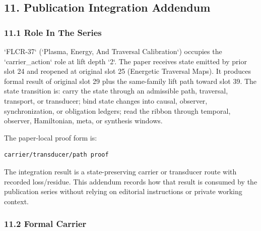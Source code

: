 \documentclass[11pt]{article}
\begin{document}
\subsection*{11. Publication Integration Addendum}

\subsubsection*{11.1 Role In The Series}

`FLCR-37` (`Plasma, Energy, And Traversal Calibration`) occupies the `carrier\_action` role at lift depth `2`.
The paper receives state emitted by prior slot 24 and reopened at original slot 25 (Energetic Traversal Maps). It produces formal result of original slot 29 plus the same-family lift path toward slot 39. The state transition is:
carry the state through an admissible path, traversal, transport, or transducer; bind state changes into causal, observer, synchronization, or obligation ledgers; read the ribbon through temporal, observer, Hamiltonian, meta, or synthesis windows.

The paper-local proof form is:

\begin{verbatim}
carrier/transducer/path proof
\end{verbatim}

The integration result is a state-preserving carrier or transducer route with recorded loss/residue. This addendum records how that result is
consumed by the publication series without relying on editorial instructions or
private working context.

\subsubsection*{11.2 Formal Carrier}
\end{document}
